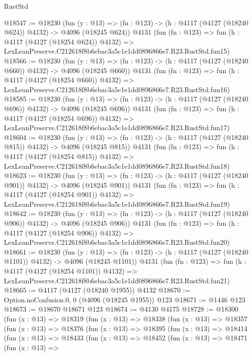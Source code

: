 \begin{lexlean}{RustStd}
\begin{coremodule}
@18547 := @18230
    (fun (y : @13) => (fn : @123) -> (h : @4117 (@4127 (@18240 @624)) @4132) -> @4096 (@18245 @624))
    @4131
    (fun (fn : @123) =>
    fun (h : @4117 (@4127 (@18254 @624)) @4132) =>
    LexLeanPreserve.C212618f8b6ebac3a5c1e1dd0896866e7.R23.RustStd.fun15)
@18566 := @18230
    (fun (y : @13) => (fn : @123) -> (h : @4117 (@4127 (@18240 @660)) @4132) -> @4096 (@18245 @660))
    @4131
    (fun (fn : @123) =>
    fun (h : @4117 (@4127 (@18254 @660)) @4132) =>
    LexLeanPreserve.C212618f8b6ebac3a5c1e1dd0896866e7.R23.RustStd.fun16)
@18585 := @18230
    (fun (y : @13) => (fn : @123) -> (h : @4117 (@4127 (@18240 @696)) @4132) -> @4096 (@18245 @696))
    @4131
    (fun (fn : @123) =>
    fun (h : @4117 (@4127 (@18254 @696)) @4132) =>
    LexLeanPreserve.C212618f8b6ebac3a5c1e1dd0896866e7.R23.RustStd.fun17)
@18604 := @18230
    (fun (y : @13) => (fn : @123) -> (h : @4117 (@4127 (@18240 @815)) @4132) -> @4096 (@18245 @815))
    @4131
    (fun (fn : @123) =>
    fun (h : @4117 (@4127 (@18254 @815)) @4132) =>
    LexLeanPreserve.C212618f8b6ebac3a5c1e1dd0896866e7.R23.RustStd.fun18)
@18623 := @18230
    (fun (y : @13) => (fn : @123) -> (h : @4117 (@4127 (@18240 @901)) @4132) -> @4096 (@18245 @901))
    @4131
    (fun (fn : @123) =>
    fun (h : @4117 (@4127 (@18254 @901)) @4132) =>
    LexLeanPreserve.C212618f8b6ebac3a5c1e1dd0896866e7.R23.RustStd.fun19)
@18642 := @18230
    (fun (y : @13) => (fn : @123) -> (h : @4117 (@4127 (@18240 @906)) @4132) -> @4096 (@18245 @906))
    @4131
    (fun (fn : @123) =>
    fun (h : @4117 (@4127 (@18254 @906)) @4132) =>
    LexLeanPreserve.C212618f8b6ebac3a5c1e1dd0896866e7.R23.RustStd.fun20)
@18661 := @18230
    (fun (y : @13) =>
    (fn : @123) -> (h : @4117 (@4127 (@18240 @1101)) @4132) -> @4096 (@18245 @1101))
    @4131
    (fun (fn : @123) =>
    fun (h : @4117 (@4127 (@18254 @1101)) @4132) =>
    LexLeanPreserve.C212618f8b6ebac3a5c1e1dd0896866e7.R23.RustStd.fun21)
@18665 := @4117 (@4127 (@18240 @1955)) @4132
@18670 := Option.noConfusion.{0, 0} (@4096 (@18245 @1955)) @123
@18671 := @1446 @123
@18673 := @18670 @18671 @123
@18674 := @4130 @4175
@18728 := @18300
    (fun (x : @13) =>
    @18319
      (fun (x : @13) =>
      @18338
        (fun (x : @13) =>
        @18357
          (fun (x : @13) =>
          @18376
            (fun (x : @13) =>
            @18395
              (fun (x : @13) =>
              @18414
                (fun (x : @13) =>
                @18433
                  (fun (x : @13) =>
                  @18452
                    (fun (x : @13) =>
                    @18471
                      (fun (x : @13) =>

\end{coremodule}
\end{lexlean}
